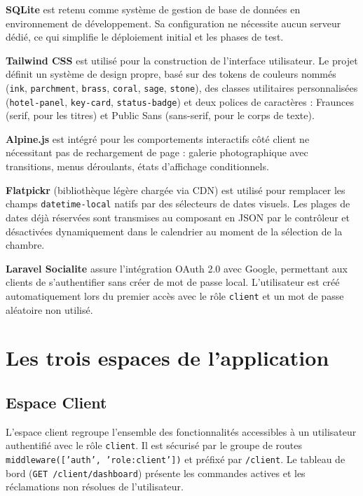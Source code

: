 \documentclass[12pt,a4paper]{report}
\begin{document}
\textbf{SQLite} est retenu comme système de gestion de base de données en
environnement de développement. Sa configuration ne nécessite aucun serveur
dédié, ce qui simplifie le déploiement initial et les phases de test.

\textbf{Tailwind CSS} est utilisé pour la construction de l'interface
utilisateur. Le projet définit un système de design propre, basé sur des
tokens de couleurs nommés (\texttt{ink}, \texttt{parchment}, \texttt{brass},
\texttt{coral}, \texttt{sage}, \texttt{stone}), des classes utilitaires
personnalisées (\texttt{hotel-panel}, \texttt{key-card}, \texttt{status-badge})
et deux polices de caractères : Fraunces (serif, pour les titres) et
Public Sans (sans-serif, pour le corps de texte).

\textbf{Alpine.js} est intégré pour les comportements interactifs côté
client ne nécessitant pas de rechargement de page : galerie photographique
avec transitions, menus déroulants, états d'affichage conditionnels.

\textbf{Flatpickr} (bibliothèque légère chargée via CDN) est utilisé pour
remplacer les champs \texttt{datetime-local} natifs par des sélecteurs de
dates visuels. Les plages de dates déjà réservées sont transmises au
composant en JSON par le contrôleur et désactivées dynamiquement dans le
calendrier au moment de la sélection de la chambre.

\textbf{Laravel Socialite} assure l'intégration OAuth 2.0 avec Google,
permettant aux clients de s'authentifier sans créer de mot de passe local.
L'utilisateur est créé automatiquement lors du premier accès avec le rôle
\texttt{client} et un mot de passe aléatoire non utilisé.

\section{Les trois espaces de l'application}

\subsection{Espace Client}

L'espace client regroupe l'ensemble des fonctionnalités accessibles à un
utilisateur authentifié avec le rôle \texttt{client}. Il est sécurisé par
le groupe de routes \texttt{middleware(['auth', 'role:client'])} et préfixé
par \texttt{/client}. Le tableau de bord (\texttt{GET /client/dashboard})
présente les commandes actives et les réclamations non résolues de
l'utilisateur.
\end{document}
